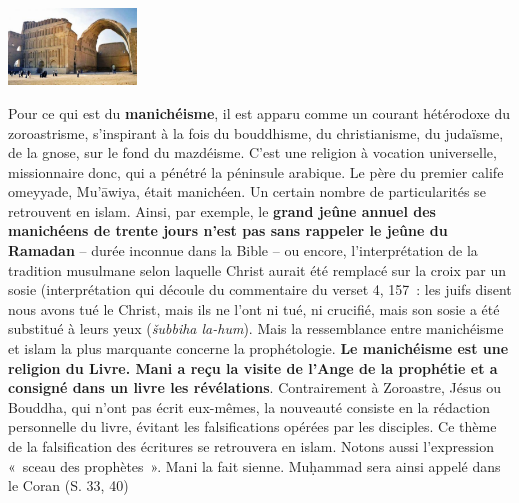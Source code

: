 {{\includegraphics[width=1.34647in,height=0.80548in]{Images/image034.jpg}}



Pour ce qui est du \textbf{manichéisme}, il est apparu comme un courant
hétérodoxe du zoroastrisme, s'inspirant à la fois du bouddhisme, du
christianisme, du judaïsme, de la gnose, sur le fond du mazdéisme. C'est
une religion à vocation universelle, missionnaire donc, qui a pénétré la
péninsule arabique. Le père du premier calife omeyyade, Mu'āwiya, était
manichéen. Un certain nombre de particularités se retrouvent en islam.
Ainsi, par exemple, le \textbf{grand jeûne annuel des manichéens de
trente jours n'est pas sans rappeler le jeûne du Ramadan} -- durée
inconnue dans la Bible -- ou encore, l'interprétation de la tradition
musulmane selon laquelle Christ aurait été remplacé sur la croix par un
sosie (interprétation qui découle du commentaire du verset 4, 157~: les
juifs disent nous avons tué le Christ, mais ils ne l'ont ni tué, ni
crucifié, mais son sosie a été substitué à leurs yeux (\emph{šubbiha
la-hum}). Mais la ressemblance entre manichéisme et islam la plus
marquante concerne la prophétologie. \textbf{Le manichéisme est une
religion du Livre. Mani a reçu la visite de l'Ange de la prophétie et a
consigné dans un livre les révélations}. Contrairement à Zoroastre,
Jésus ou Bouddha, qui n'ont pas écrit eux-mêmes, la nouveauté consiste
en la rédaction personnelle du livre, évitant les falsifications opérées
par les disciples. Ce thème de la falsification des écritures se
retrouvera en islam. Notons aussi l'expression «~sceau des prophètes~».
Mani la fait sienne. Muḥammad sera ainsi appelé dans le Coran (S. 33,
40)

}
